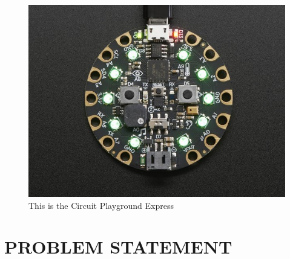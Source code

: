 \documentclass[12pt]{article}
\begin{document}
\begin{figure}[!t]
\centering
\includegraphics[width=4.5in]{cpx01.jpg}
\caption{This is the Circuit Playground Express}
\label{fig:cpx}
\end{figure}

\section{PROBLEM STATEMENT}


\end{document}
